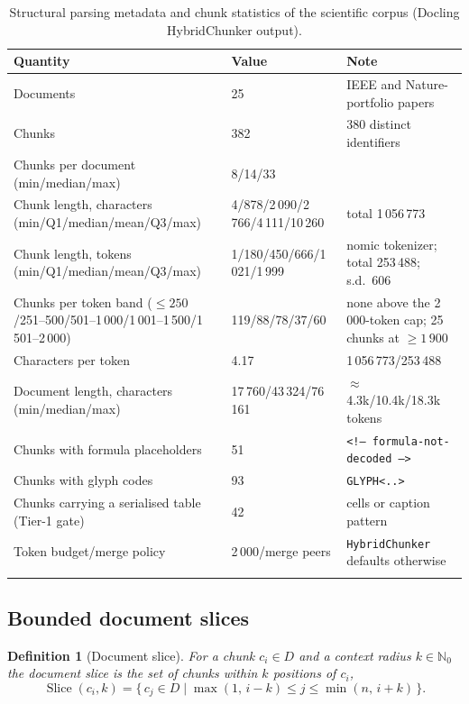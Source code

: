 \documentclass[pdflatex,sn-mathphys-num]{sn-jnl}
\newcommand{\Slice}{\operatorname{Slice}}
\theoremstyle{thmstyleone}%
\theoremstyle{thmstylethree}%
\newtheorem{definition}{Definition}%
\begin{document}
\begin{table}[htbp]
\caption{Structural parsing metadata and chunk statistics of the scientific corpus (Docling HybridChunker output).}\label{tab:parsing}
\begin{tabular}{@{}p{5.4cm}p{4.3cm}p{3.7cm}@{}}
\toprule
Quantity & Value & Note \\
\midrule
Documents & 25 & IEEE and Nature-portfolio papers \\
Chunks & 382 & 380 distinct identifiers\footnotemark[1] \\
Chunks per document (min/median/max) & 8/14/33 & \\
Chunk length, characters (min/Q1/median/mean/Q3/max) & 4/878/2\,090/2\,766/4\,111/10\,260 & total 1\,056\,773 \\
Chunk length, tokens (min/Q1/median/mean/Q3/max) & 1/180/450/666/1\,021/1\,999 & nomic tokenizer; total 253\,488; s.d.\ 606 \\
Chunks per token band ($\le 250$/251--500/501--1\,000/1\,001--1\,500/1\,501--2\,000) & 119/88/78/37/60 & none above the 2\,000-token cap; 25 chunks at $\ge 1\,900$ \\
Characters per token & 4.17 & 1\,056\,773/253\,488 \\
Document length, characters (min/median/max) & 17\,760/43\,324/76\,161 & $\approx$ 4.3k/10.4k/18.3k tokens \\
Chunks with formula placeholders & 51 & \texttt{\textless!-- formula-not-decoded --\textgreater} \\
Chunks with glyph codes & 93 & \texttt{GLYPH\textless..\textgreater} \\
Chunks carrying a serialised table (Tier-1 gate) & 42 & cells or caption pattern \\
Token budget/merge policy & 2\,000/merge peers & \texttt{HybridChunker} defaults otherwise \\
\botrule
\end{tabular}
\end{table}

\subsection{Bounded document slices}\label{sec:slice}

\begin{definition}[Document slice]\label{def:slice}
For a chunk $c_i\in D$ and a context radius $k\in\mathbb{N}_0$ the document slice is the set of chunks within $k$ positions of $c_i$,
\begin{equation}\label{eq:slice}
\Slice(c_i,k)=\{\,c_j\in D \mid \max(1,\,i-k)\le j\le \min(n,\,i+k)\,\}.
\end{equation}
\end{definition}
\end{document}
